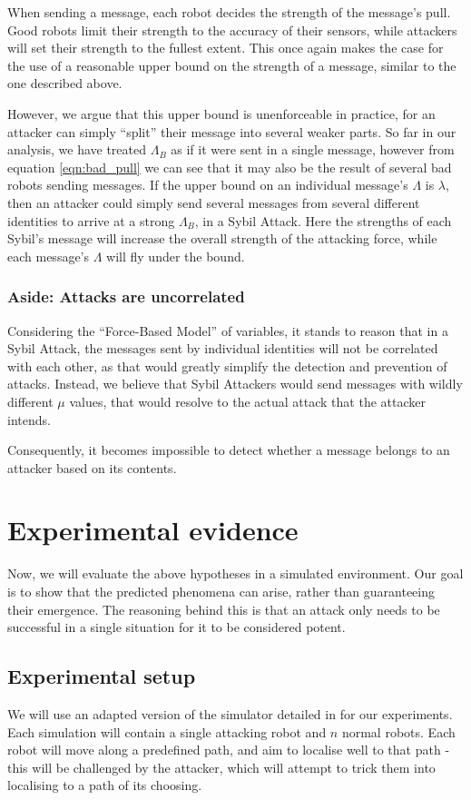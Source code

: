 When sending a message, each robot decides the strength of the message's pull. Good robots limit their strength to the accuracy of their sensors, while attackers will set their strength to the fullest extent. This once again makes the case for the use of a reasonable upper bound on the strength of a message, similar to the one described above.

However, we argue that this upper bound is unenforceable in practice, for an attacker can simply ``split'' their message into several weaker parts. So far in our analysis, we have treated $\Lambda_B$ as if it were sent in a single message, however from equation \ref{eqn:bad_pull} we can see that it may also be the result of several bad robots sending messages. If the upper bound on an individual message's $\Lambda$ is $\lambda$, then an attacker could simply send several messages from several different identities to arrive at a strong $\Lambda_B$, in a Sybil Attack. Here the strengths of each Sybil's message will increase the overall strength of the attacking force, while each message's $\Lambda$ will fly under the bound.


\subsubsection{Aside: Attacks are uncorrelated} \label{hyp:uncorrelated_sybils}
Considering the ``Force-Based Model'' of variables, it stands to reason that in a Sybil Attack, the messages sent by individual identities will not be correlated with each other, as that would greatly simplify the detection and prevention of attacks. Instead, we believe that Sybil Attackers would send messages with wildly different $\mu$ values, that would resolve to the actual attack that the attacker intends.

Consequently, it becomes impossible to detect whether a message belongs to an attacker based on its contents.

\section{Experimental evidence}

Now, we will evaluate the above hypotheses in a simulated environment. Our goal is to show that the predicted phenomena can arise, rather than guaranteeing their emergence. The reasoning behind this is that an attack only needs to be successful in a single situation for it to be considered potent.

\subsection{Experimental setup}
We will use an adapted version of the simulator detailed in \cite[RobotWeb]{Robotweb} for our experiments. Each simulation will contain a single attacking robot and $n$ normal robots. Each robot will move along a predefined path, and aim to localise well to that path - this will be challenged by the attacker, which will attempt to trick them into localising to a path of its choosing.

